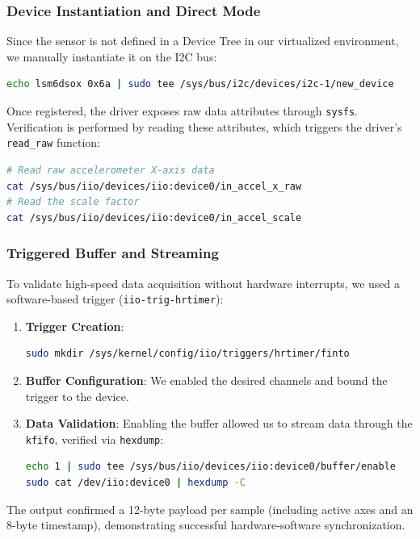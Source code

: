 \documentclass[10pt,a4paper]{article}
\begin{document}
\subsubsection{Device Instantiation and Direct Mode}
Since the sensor is not defined in a Device Tree in our virtualized environment, we manually instantiate it on the I2C bus:
\begin{lstlisting}[language=bash]
echo lsm6dsox 0x6a | sudo tee /sys/bus/i2c/devices/i2c-1/new_device
\end{lstlisting}
Once registered, the driver exposes raw data attributes through \texttt{sysfs}. Verification is performed by reading these attributes, which triggers the driver's \texttt{read\_raw} function:
\begin{lstlisting}[language=bash]
# Read raw accelerometer X-axis data
cat /sys/bus/iio/devices/iio:device0/in_accel_x_raw
# Read the scale factor
cat /sys/bus/iio/devices/iio:device0/in_accel_scale
\end{lstlisting}

\subsubsection{Triggered Buffer and Streaming}
To validate high-speed data acquisition without hardware interrupts, we used a software-based trigger (\texttt{iio-trig-hrtimer}):
\begin{enumerate}
    \item \textbf{Trigger Creation}:
    \begin{lstlisting}[language=bash]
sudo mkdir /sys/kernel/config/iio/triggers/hrtimer/finto
    \end{lstlisting}
    \item \textbf{Buffer Configuration}: We enabled the desired channels and bound the trigger to the device.
    \item \textbf{Data Validation}: Enabling the buffer allowed us to stream data through the \texttt{kfifo}, verified via \texttt{hexdump}:
    \begin{lstlisting}[language=bash]
echo 1 | sudo tee /sys/bus/iio/devices/iio:device0/buffer/enable
sudo cat /dev/iio:device0 | hexdump -C
    \end{lstlisting}
\end{enumerate}
The output confirmed a 12-byte payload per sample (including active axes and an 8-byte timestamp), demonstrating successful hardware-software synchronization.
\end{document}
